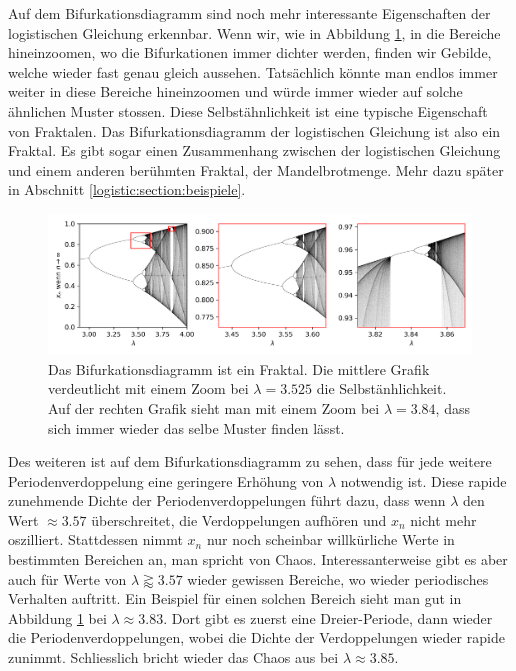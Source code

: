 Auf dem Bifurkationsdiagramm sind noch mehr 
interessante Eigenschaften der logistischen Gleichung erkennbar.
Wenn wir, wie in Abbildung \ref{fig:map_zoom}, in die Bereiche hineinzoomen,
wo die Bifurkationen immer dichter werden, finden wir Gebilde, 
welche wieder fast genau gleich aussehen.
Tatsächlich könnte man endlos immer weiter in diese
Bereiche hineinzoomen und würde immer wieder auf solche ähnlichen Muster stossen. 
Diese Selbstähnlichkeit ist eine typische Eigenschaft von Fraktalen.
%
%
Das Bifurkationsdiagramm der logistischen Gleichung ist also ein Fraktal.
Es gibt sogar einen Zusammenhang zwischen der logistischen Gleichung und 
einem anderen berühmten Fraktal, der Mandelbrotmenge.
%
Mehr dazu später in Abschnitt 
\ref{logistic:section:beispiele}.
\begin{figure}
    \includegraphics[width=\linewidth]{papers/logistic/figures/map_zoom.png}
    \caption{
        Das Bifurkationsdiagramm ist ein Fraktal.
        Die mittlere Grafik verdeutlicht mit einem Zoom 
        bei $\lambda = 3.525$ die Selbstänhlichkeit. 
        Auf der rechten Grafik sieht man mit einem
        Zoom bei $\lambda = 3.84$, dass sich immer
        wieder das selbe Muster finden lässt.
    }
    \label{fig:map_zoom}
\end{figure}

Des weiteren ist auf dem Bifurkationsdiagramm zu sehen,
dass für jede weitere Periodenverdoppelung eine geringere
Erhöhung von $\lambda$ notwendig ist.
Diese rapide zunehmende Dichte der Periodenverdoppelungen führt dazu, 
dass wenn $\lambda$ den Wert $\approx 3.57$ überschreitet, 
die Verdoppelungen aufhören und $x_n$ nicht mehr oszilliert. 
Stattdessen nimmt $x_n$ nur noch scheinbar 
willkürliche Werte in bestimmten Bereichen an, 
man spricht von Chaos.
Interessanterweise gibt es aber auch für Werte von 
$\lambda \gtrapprox 3.57$ wieder gewissen Bereiche,
wo wieder periodisches Verhalten auftritt. 
Ein Beispiel für einen solchen Bereich sieht man
gut in Abbildung \ref{fig:map_zoom} bei 
$\lambda \approx 3.83$. 
Dort gibt es zuerst eine Dreier-Periode, 
dann wieder die Periodenverdoppelungen, 
wobei die Dichte der Verdoppelungen
wieder rapide zunimmt.
Schliesslich bricht wieder das Chaos aus bei 
$\lambda \approx 3.85$.
